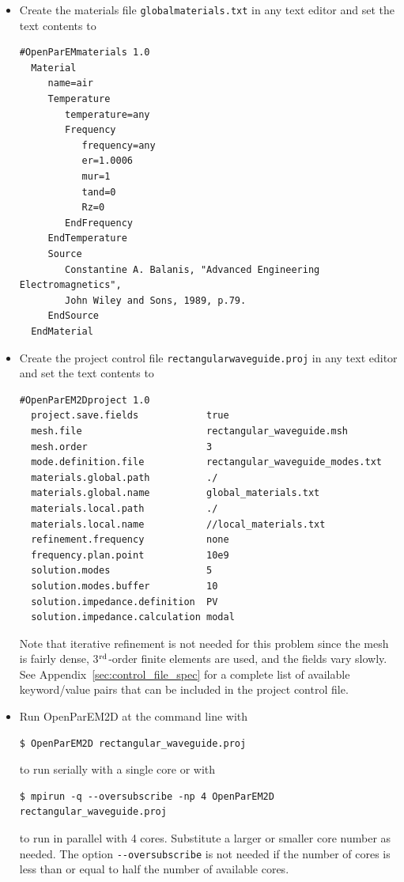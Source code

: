 \documentclass[titlepage]{article}
\renewcommand\_{\textunderscore\linebreak[1]}
\begin{document}
\begin{itemize}

\item Create the materials file \texttt{global\_materials.txt} in any text editor and set the text contents to
\begin{Verbatim}[fontsize=\small]
  #OpenParEMmaterials 1.0
  Material
     name=air
     Temperature
        temperature=any
        Frequency
           frequency=any
           er=1.0006
           mur=1
           tand=0
           Rz=0
        EndFrequency
     EndTemperature
     Source
        Constantine A. Balanis, "Advanced Engineering Electromagnetics",
        John Wiley and Sons, 1989, p.79.
     EndSource
  EndMaterial
\end{Verbatim}
\item Create the project control file \texttt{rectangular\_waveguide.proj} in any text editor and set the text contents to
\begin{Verbatim}[fontsize=\small]
  #OpenParEM2Dproject 1.0
  project.save.fields            true
  mesh.file                      rectangular_waveguide.msh
  mesh.order                     3
  mode.definition.file           rectangular_waveguide_modes.txt
  materials.global.path          ./
  materials.global.name          global_materials.txt
  materials.local.path           ./
  materials.local.name           //local_materials.txt
  refinement.frequency           none
  frequency.plan.point           10e9
  solution.modes                 5
  solution.modes.buffer          10
  solution.impedance.definition  PV
  solution.impedance.calculation modal
\end{Verbatim}

\noindent Note that iterative refinement is not needed for this problem since the mesh is fairly dense, 3$^{\textnormal{rd}}$-order finite elements are used, and the fields vary slowly.  See Appendix~\ref{sec:control_file_spec} for a complete list of available keyword/value pairs that can be included in the project control file.

\item Run OpenParEM2D at the command line with
\begin{Verbatim}[fontsize=\small]
   $ OpenParEM2D rectangular_waveguide.proj
\end{Verbatim}
to run serially with a single core or with
\begin{Verbatim}[fontsize=\small]
   $ mpirun -q --oversubscribe -np 4 OpenParEM2D rectangular_waveguide.proj
\end{Verbatim}
to run in parallel with 4 cores.  Substitute a larger or smaller core number as needed.  The option \verb+--oversubscribe+ is not needed if the number of cores is less than or equal to half the number of available cores.
\end{itemize}
\end{document}
